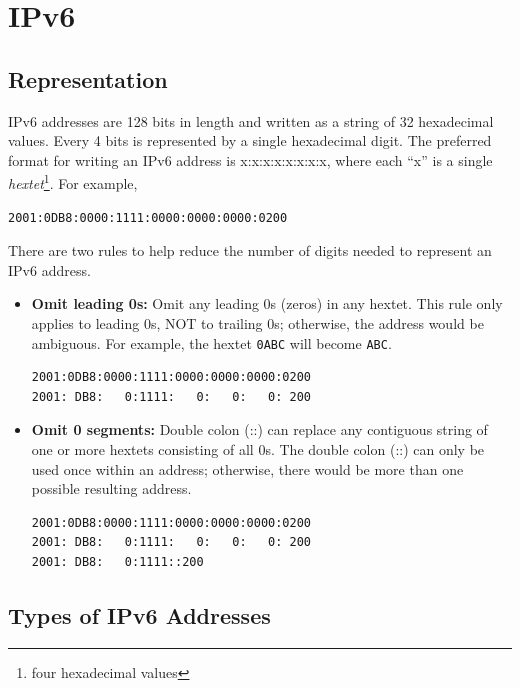 \chapter{IPv6}

\section{Representation}

IPv6 addresses are 128 bits in length and written as a string of 32 hexadecimal values. Every 4 bits is represented by a single hexadecimal digit. The preferred format for writing an IPv6 address is x:x:x:x:x:x:x:x, where each ``x'' is a single \emph{hextet}\footnote{four hexadecimal values}. For example,

\begin{verbatim}
2001:0DB8:0000:1111:0000:0000:0000:0200
\end{verbatim}

There are two rules to help reduce the number of digits needed to represent an IPv6 address.

\begin{itemize}
\item \textbf{Omit leading 0s:} Omit any leading 0s (zeros) in any hextet. This rule only applies to leading 0s, NOT to trailing 0s; otherwise, the address would be ambiguous. For example, the hextet \verb|0ABC| will become \verb|ABC|.

\begin{verbatim}
2001:0DB8:0000:1111:0000:0000:0000:0200
2001: DB8:   0:1111:   0:   0:   0: 200
\end{verbatim}

\item \textbf{Omit 0 segments:} Double colon (::) can replace any contiguous string of one or more hextets consisting of all 0s. The double colon (::) can only be used once within an address; otherwise, there would be more than one possible resulting address. 

\begin{verbatim}
2001:0DB8:0000:1111:0000:0000:0000:0200
2001: DB8:   0:1111:   0:   0:   0: 200
2001: DB8:   0:1111::200
\end{verbatim}
\end{itemize}

\section{Types of IPv6 Addresses}

